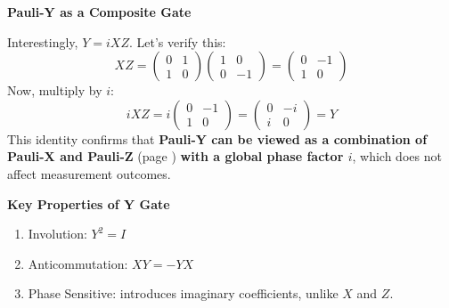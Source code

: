 \highspace
\begin{flushleft}
    \textcolor{Green3}{ \textbf{Pauli-Y as a Composite Gate}}
\end{flushleft}
Interestingly, $Y = i X Z$. Let's verify this:
\begin{equation*}
    XZ = \begin{pmatrix}
        0 & 1 \\ 1 & 0
    \end{pmatrix}
    \begin{pmatrix}
        1 & 0 \\ 0 & -1
    \end{pmatrix}
    =
    \begin{pmatrix}
        0 & -1 \\ 1 & 0
    \end{pmatrix}
\end{equation*}
Now, multiply by $i$:
\begin{equation*}
    iXZ = i \begin{pmatrix}
        0 & -1 \\ 1 & 0
    \end{pmatrix}
    =
    \begin{pmatrix}
        0 & -i \\ i & 0
    \end{pmatrix}
    = Y
\end{equation*}
This identity confirms that \textbf{Pauli-Y can be viewed as a combination of Pauli-X and Pauli-Z} (page \pageref{subsubsection: Pauli-Z Phase Flip Gate}) \textbf{with a global phase factor $i$}, which does not affect measurement outcomes.

\highspace
\begin{flushleft}
    \textcolor{Green3}{ \textbf{Key Properties of Y Gate}}
\end{flushleft}
\begin{enumerate}
    \item Involution: $Y^{2} = I$
    \item Anticommutation: $XY = -YX$
    \item Phase Sensitive: introduces imaginary coefficients, unlike $X$ and $Z$.
\end{enumerate}

